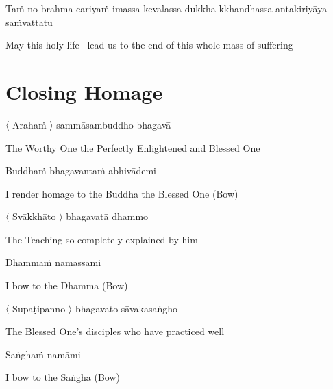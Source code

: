 \begin{pali-hang}
  Taṁ no brahma-cariyaṁ imassa kevalassa dukkha-kkhandhassa antakiriyāya saṁvattatu
\end{pali-hang}

\begin{english}
  May this holy life \breathmark\ lead us to the end of this whole mass of suffering
\end{english}


\section{Closing Homage}
\label{closing-homage}

〈 Arahaṁ 〉 sammāsambuddho bhagavā

\begin{english}
  The Worthy One the Perfectly Enlightened and Blessed One
\end{english}

Buddhaṁ bhagavantaṁ abhivādemi

\begin{english}
  I render homage to the Buddha the Blessed One \hfill{(Bow)}
\end{english}

〈 Svākkhāto 〉 bhagavatā dhammo

\begin{english}
  The Teaching so completely explained by him
\end{english}

Dhammaṁ namassāmi

\begin{english}
  I bow to the Dhamma \hfill{(Bow)}
\end{english}

〈 Supaṭipanno 〉 bhagavato sāvakasaṅgho

\begin{english}
  The Blessed One's disciples who have practiced well
\end{english}

Saṅghaṁ namāmi

\begin{english}
  I bow to the Saṅgha \hfill{(Bow)}\\
\end{english}

\null
\vfill

